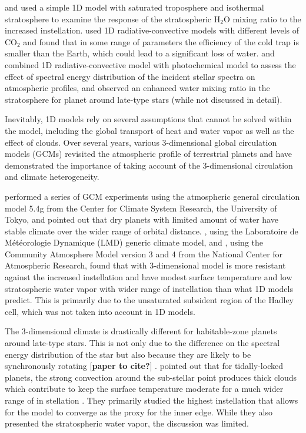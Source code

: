 \documentclass[11pt,numberedappendix,twocolappendix,]{emulateapj}
\def\water{H$_2$O }
\def\memo#1{\color{red}$[${\bf #1}$]$ \color{black}}
\begin{document}
\citet{Kasting1993} and \citet{Kopparapu2013} used a simple 1D model with saturated troposphere and isothermal stratosphere to examine the response of the stratospheric \water mixing ratio to the increased instellation. 
% 
\citet{Wordsworth2013} used 1D radiative-convective models with different levels of CO$_2$ and found that in some range of parameters the efficiency of the cold trap is smaller than the Earth, which could lead to a significant loss of water. 
%
\citet{Rugheimer2013} and \citet{Rugheimer2015} combined 1D radiative-convective model with photochemical model to assess the effect of spectral energy distribution of the incident stellar spectra on atmospheric profiles, and observed an enhanced water mixing ratio in the stratosphere for planet around late-type stars (while not discussed in detail). 

Inevitably, 1D models rely on several assumptions that cannot be solved within the model, including the global transport of heat and water vapor as well as the effect of clouds. 
Over several years, various 3-dimensional global circulation models (GCMs) revisited the atmospheric profile of terrestrial planets and have demonstrated the importance of taking account of the 3-dimensional circulation and climate heterogeneity. 

 \citet{Abe2011} performed a series of GCM experiments using the atmospheric general circulation model 5.4g from the Center for Climate System Research, the University of Tokyo, and pointed out that dry planets with limited amount of water have stable climate over the wider range of orbital distance. 
\citet{Leconte2013b}, using the Laboratoire de M\'et\'eorologie Dynamique (LMD) generic climate model, and 
\citet{Wolf2014, Wolf2015}, using the Community Atmosphere Model version 3 and 4 from the National Center for Atmospheric Research, found that with 3-dimensional model is more resistant against the increased instellation and have modest surface temperature and low stratospheric water vapor with wider range of instellation than what 1D models predict. This is primarily due to the unsaturated subsident region of the Hadley cell, which was not taken into account in 1D models. 

The 3-dimensional climate is drastically different for habitable-zone planets around late-type stars. 
This is not only due to the difference on the spectral energy distribution of the star but also because they are likely to be synchronously rotating \memo{paper to cite?}. 
%
\citet{Yang2013} pointed out that for tidally-locked planets, the strong convection around the sub-stellar point produces thick clouds which contribute to keep the surface temperature moderate for a much wider range of in stellation \citep[see also][]{Yang2014,Way2015,Kopparapu2016}. 
They primarily studied the highest instellation that allows for the model to converge as the proxy for the inner edge. 
While they also presented the stratospheric water vapor, the discussion was limited. 
\end{document}
